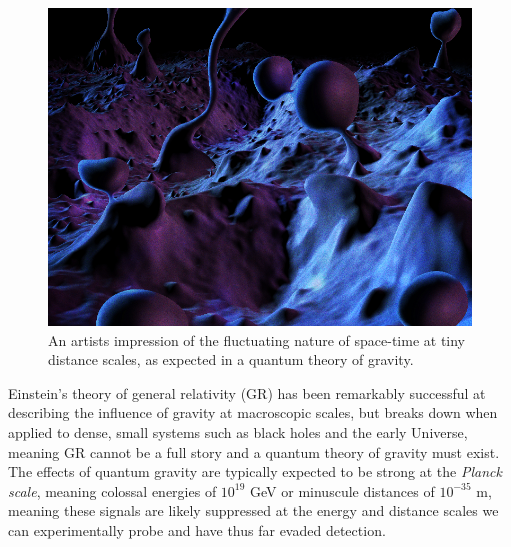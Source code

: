\documentclass[a4paper,11pt]{article}
\begin{document}

\begin{figure} %
    \centering
		\includegraphics[width=1.\linewidth]{images/quantum_foam_2.png}
		\caption{An artists impression of the fluctuating nature of space-time at tiny distance scales, as expected in a quantum theory of gravity.}
		\vspace{-7pt}
		\label{fig:spacetime_foam}
\end{figure}

Einstein's theory of general relativity (GR) has been remarkably successful at describing the influence of gravity at macroscopic scales, but breaks down when applied to dense, small systems such as black holes and the early Universe, meaning GR cannot be a full story and a quantum theory of gravity must exist. The effects of quantum gravity are typically expected to be strong at the \textit{Planck scale}, meaning colossal energies of $10^{19}$ GeV or minuscule distances of $10^{-35}$ m, meaning these signals are likely suppressed at the energy and distance scales we can experimentally probe and have thus far evaded detection.
\end{document}
